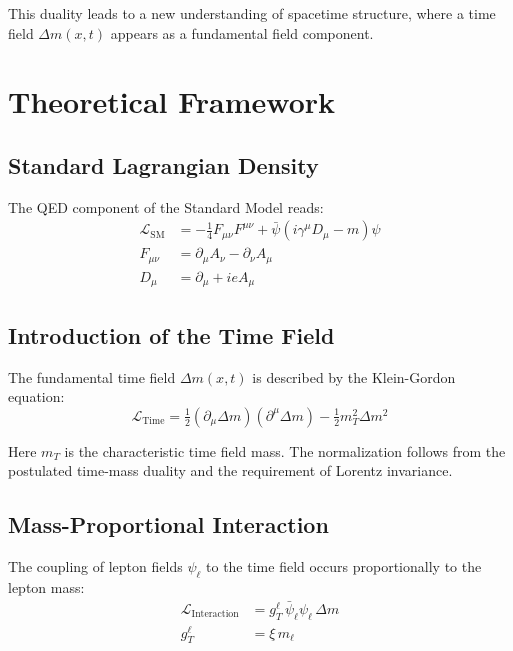 \documentclass[12pt,a4paper]{article}
\theoremstyle{definition}
\begin{document}
	This duality leads to a new understanding of spacetime structure, where a time field $\Delta m(x,t)$ appears as a fundamental field component\cite{pascher_lagrangian_extended_2025}.
	
	\section{Theoretical Framework}
	
	\subsection{Standard Lagrangian Density}
	
	The QED component of the Standard Model reads:
	\begin{align}
		\mathcal{L}_{\text{SM}} &= -\tfrac{1}{4} F_{\mu\nu}F^{\mu\nu} + \bar{\psi}(i\gamma^\mu D_\mu - m)\psi \label{eq:sm_lagrangian}\\
		F_{\mu\nu} &= \partial_\mu A_\nu - \partial_\nu A_\mu \label{eq:field_tensor}\\
		D_\mu &= \partial_\mu + ieA_\mu \label{eq:covariant_derivative}
	\end{align}
	
	\subsection{Introduction of the Time Field}
	
	The fundamental time field $\Delta m(x,t)$ is described by the Klein-Gordon equation:
	\begin{equation}
		\mathcal{L}_{\text{Time}} = \tfrac{1}{2}(\partial_\mu \Delta m)(\partial^\mu \Delta m) - \tfrac{1}{2} m_T^2 \Delta m^2
		\label{eq:time_field_lagrangian}
	\end{equation}
	
	Here $m_T$ is the characteristic time field mass. The normalization follows from the postulated time-mass duality and the requirement of Lorentz invariance\cite{pascher_mathematical_structure_2025}.
	
	\subsection{Mass-Proportional Interaction}
	
	The coupling of lepton fields $\psi_\ell$ to the time field occurs proportionally to the lepton mass:
	\begin{align}
		\mathcal{L}_{\text{Interaction}} &= g_T^\ell \, \bar{\psi}_\ell \psi_\ell \, \Delta m \label{eq:interaction_lagrangian}\\
		g_T^\ell &= \xi \, m_\ell \label{eq:coupling_strength}
	\end{align}
	
\end{document}
